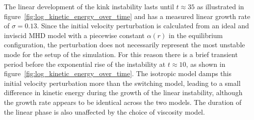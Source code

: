 The linear development of the kink instability lasts until $t\approx 35$ as illustrated in   figure~\ref{fig:log_kinetic_energy_over_time} and has a measured linear growth rate of $\sigma = 0.13$. Since the initial velocity perturbation is calculated from an ideal and inviscid MHD model with a piecewise constant $\alpha(r)$ in the equilibrium configuration, the perturbation does not necessarily represent the most unstable mode for the setup of the simulation. For this reason there is a brief transient period before the exponential rise of the instability at $t\approx10$, as shown in figure~\ref{fig:log_kinetic_energy_over_time}. The isotropic model damps this initial velocity perturbation more than the switching model, leading to a small difference in kinetic energy during the growth of the linear instability, although the growth rate appears to be identical across the two models. The duration of the linear phase is also unaffected by the choice of viscosity model.

